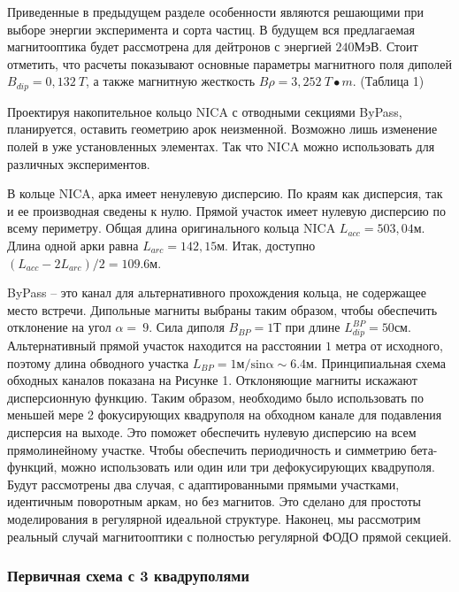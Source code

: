 \par Приведенные в предыдущем разделе особенности являются решающими при выборе энергии эксперимента и сорта частиц. В будущем вся предлагаемая магнитооптика будет рассмотрена для дейтронов с энергией $240 МэВ$. Стоит отметить, что расчеты показывают основные параметры магнитного поля диполей $B_{dip}=0,132\ T$, а также магнитную жесткость $B\rho=3,252\ T\bullet m$. (Таблица 1)
\par Проектируя накопительное кольцо NICA с отводными секциями ByPass, планируется, оставить геометрию арок неизменной. Возможно лишь изменение полей в уже установленных элементах. Так что NICA можно использовать для различных экспериментов.
\par В кольце NICA, арка имеет ненулевую дисперсию. По краям как дисперсия, так и ее производная сведены к нулю. Прямой участок имеет нулевую дисперсию по всему периметру. Общая длина оригинального кольца NICA $L_{acc}=503,04 м$. Длина одной арки равна $L_{arc}=142,15 м$. Итак, доступно $\left(L_{acc}-2L_{arc}\right)/2=109.6 м$. 
\par ByPass – это канал для альтернативного прохождения кольца, не содержащее место встречи. Дипольные магниты выбраны таким образом, чтобы обеспечить отклонение на угол $\alpha=\ 9$. Сила диполя $B_{BP}=1 Т$ при длине $L_{dip}^{BP}=50 см$. Альтернативный прямой участок находится на расстоянии $1$ метра от исходного, поэтому длина обводного участка $L_{BP}=1\mathrm{м/sin\alpha}\sim6.4 м$. Принципиальная схема обходных каналов показана на Рисунке 1.
	Отклоняющие магниты искажают дисперсионную функцию. Таким образом, необходимо было использовать по меньшей мере 2 фокусирующих квадруполя на обходном канале для подавления дисперсия на выходе. Это поможет обеспечить нулевую дисперсию на всем прямолинейному участке. Чтобы обеспечить периодичность и симметрию бета-функций, можно использовать или один или три дефокусирующих квадруполя.
	Будут рассмотрены два случая, с адаптированными прямыми участками, идентичным поворотным аркам, но без магнитов. Это сделано для простоты моделирования в регулярной идеальной структуре. Наконец, мы рассмотрим реальный случай магнитооптики с полностью регулярной ФОДО прямой секцией.
	
\subsubsection{Первичная схема с 3 квадруполями}\label{sec:EDM/Wien_filter/ByPass/3quad}

